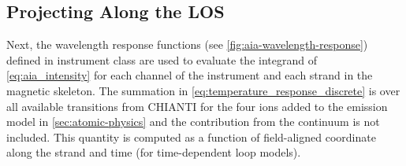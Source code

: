 \subsection{Projecting Along the LOS}

Next, the wavelength response functions (see \autoref{fig:aia-wavelength-response}) defined in instrument class are used to evaluate the integrand of \autoref{eq:aia_intensity} for each channel of the instrument and each strand in the magnetic skeleton. The summation in \autoref{eq:temperature_response_discrete} is over all available transitions from CHIANTI for the four ions added to the emission model in \autoref{sec:atomic-physics} and the contribution from the continuum is not included. This quantity is computed as a function of field-aligned coordinate along the strand and time (for time-dependent loop models).

